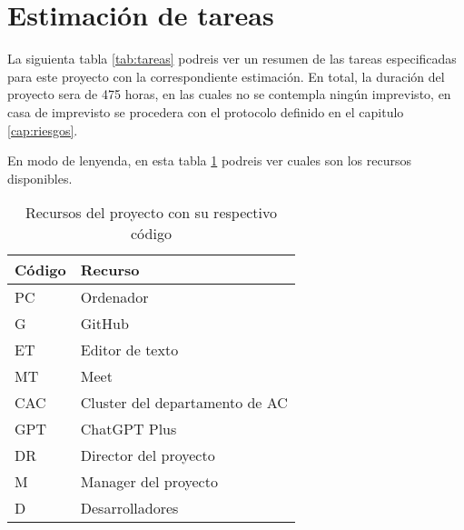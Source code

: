 \section{Estimación de tareas}
\label{sec:estimacion_tareas}

La siguienta tabla \ref{tab:tareas} podreis ver un resumen de las tareas especificadas para este proyecto con la correspondiente estimación. En total,
la duración del proyecto sera de 475 horas, en las cuales no se contempla ningún imprevisto, en casa de imprevisto se procedera con el protocolo definido
en el capitulo \ref{cap:riesgos}.

En modo de lenyenda, en esta tabla \ref{tab:recursos} podreis ver cuales son los recursos disponibles.

\begin{table}[H]
    \centering
    \begin{tabular}{|l|l|}
    \hline
    \rowcolor[HTML]{8EA9D8} 
    Código & Recurso                        \\ \hline
    PC     & Ordenador                      \\ \hline
    G      & GitHub                         \\ \hline
    ET     & Editor de texto                \\ \hline
    MT     & Meet                           \\ \hline
    CAC    & Cluster del departamento de AC \\ \hline
    GPT    & ChatGPT Plus                   \\ \hline
    DR     & Director del proyecto          \\ \hline
    M      & Manager del proyecto           \\ \hline
    D      & Desarrolladores                \\ \hline
    \end{tabular}
    \caption{Recursos del proyecto con su respectivo código}
    \label{tab:recursos}
\end{table}

